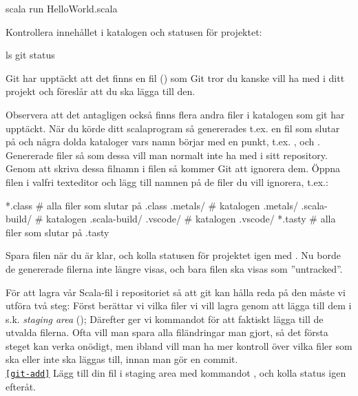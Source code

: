 \begin{Datorarbete}
\begin{Code}
scala run HelloWorld.scala
\end{Code}

Kontrollera innehållet i katalogen och statusen för projektet:

\begin{Code}
ls
git status
\end{Code}

Git har upptäckt att det finns en fil () som Git tror du kanske vill ha med i ditt projekt och föreslår att du ska lägga till den.

Observera att det antagligen också finns flera andra filer i katalogen som git har upptäckt. När du körde ditt scalaprogram så genererades t.ex. en fil som slutar på  och några dolda kataloger vars namn börjar med en punkt, t.ex. ,  och . Genererade filer så som dessa vill man normalt inte ha med i sitt repository. Genom att skriva dessa filnamn i filen  så kommer Git att ignorera dem. Öppna filen  i valfri texteditor och lägg till namnen på de filer du vill ignorera, t.ex.:

\begin{Code}
*.class         # alla filer som slutar på .class
.metals/        # katalogen .metals/
.scala-build/   # katalogen .scala-build/
.vscode/        # katalogen .vscode/
*.tasty         # alla filer som slutar på .tasty
\end{Code}


Spara filen när du är klar, och kolla statusen för projektet igen med . Nu borde de genererade filerna inte längre visas, och bara filen  ska visas som ''untracked''.

För att lagra vår Scala-fil i repositoriet så att git kan hålla reda på den måste vi utföra två steg: Först berättar vi vilka filer vi vill lagra genom att lägga till dem i s.k. \emph{staging area} (); Därefter ger vi kommandot  för att faktiskt lägga till de utvalda filerna. Ofta vill man spara alla filändringar man gjort, så det första steget kan verka onödigt, men ibland vill man ha mer kontroll över vilka filer som ska eller inte ska läggas till, innan man gör en commit.
\\

\texttt{\ref{git-add}} Lägg till din fil i staging area med kommandot , och kolla status igen efteråt.
\\


\end{Datorarbete}
